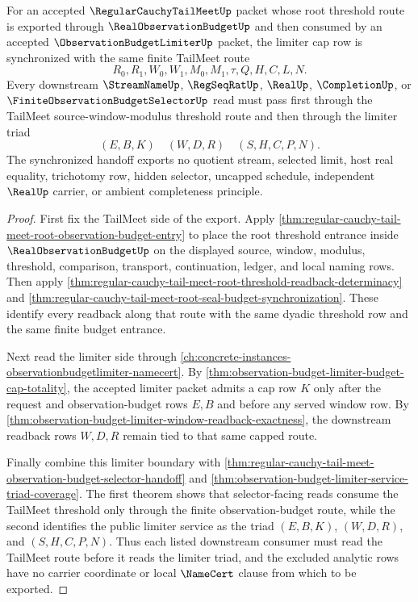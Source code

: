 \begin{theorem}
\label{thm:regular-cauchy-tail-meet-observation-budget-limiter-cap-synchronization}
For an accepted $\RegularCauchyTailMeetUp$ packet whose root threshold route is exported through $\RealObservationBudgetUp$ and then consumed by an accepted $\ObservationBudgetLimiterUp$ packet, the limiter cap row is synchronized with the same finite TailMeet route
$$
R_0,R_1,W_0,W_1,M_0,M_1,\tau,Q,H,C,L,N.
$$
Every downstream $\StreamNameUp$, $\RegSeqRatUp$, $\RealUp$, $\CompletionUp$, or $\FiniteObservationBudgetSelectorUp$ read must pass first through the TailMeet source-window-modulus threshold route and then through the limiter triad
$$
(E,B,K)\quad (W,D,R)\quad (S,H,C,P,N).
$$
The synchronized handoff exports no quotient stream, selected limit, host real equality, trichotomy row, hidden selector, uncapped schedule, independent $\RealUp$ carrier, or ambient completeness principle.
\end{theorem}
\begin{proof}
First fix the TailMeet side of the export. Apply \autoref{thm:regular-cauchy-tail-meet-root-observation-budget-entry} to place the root threshold entrance inside $\RealObservationBudgetUp$ on the displayed source, window, modulus, threshold, comparison, transport, continuation, ledger, and local naming rows. Then apply \autoref{thm:regular-cauchy-tail-meet-root-threshold-readback-determinacy} and \autoref{thm:regular-cauchy-tail-meet-root-seal-budget-synchronization}. These identify every readback along that route with the same dyadic threshold row and the same finite budget entrance.

Next read the limiter side through \autoref{ch:concrete-instances-observationbudgetlimiter-namecert}. By \autoref{thm:observation-budget-limiter-budget-cap-totality}, the accepted limiter packet admits a cap row $K$ only after the request and observation-budget rows $E,B$ and before any served window row. By \autoref{thm:observation-budget-limiter-window-readback-exactness}, the downstream readback rows $W,D,R$ remain tied to that same capped route.

Finally combine this limiter boundary with \autoref{thm:regular-cauchy-tail-meet-observation-budget-selector-handoff} and \autoref{thm:observation-budget-limiter-service-triad-coverage}. The first theorem shows that selector-facing reads consume the TailMeet threshold only through the finite observation-budget route, while the second identifies the public limiter service as the triad $(E,B,K)$, $(W,D,R)$, and $(S,H,C,P,N)$. Thus each listed downstream consumer must read the TailMeet route before it reads the limiter triad, and the excluded analytic rows have no carrier coordinate or local $\NameCert$ clause from which to be exported.
\end{proof}

